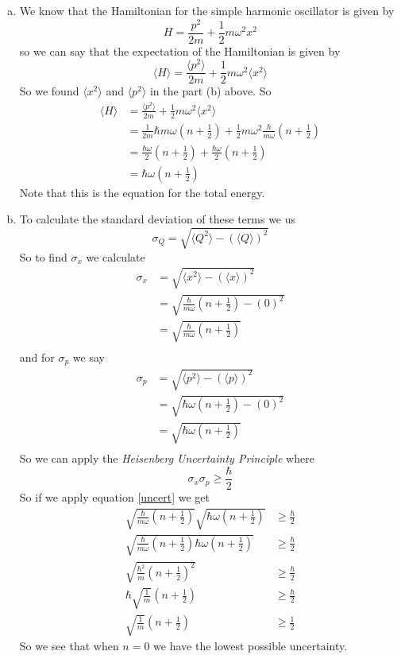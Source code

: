 \documentclass[11pt]{article}
\numberwithin{equation}{section}
\newcommand{\expt}[1]{\langle{#1}\rangle}
\begin{document}
\begin{enumerate}[(a)]
\item
We know that the Hamiltonian for the simple harmonic oscillator is given by
$$H = \frac{p^2}{2m}+\frac{1}{2}m\omega^2x^2$$
so we can say that the expectation of the Hamiltonian is given by
$$\expt{H} = \frac{\expt{p^2}}{2m}+\frac{1}{2}m\omega^2\expt{x^2}$$
So we found $\expt{x^2}$ and $\expt{p^2}$ in the part (b) above. So
\begin{align*}
\expt{H} &= \frac{\expt{p^2}}{2m}+\frac{1}{2}m\omega^2\expt{x^2}\\
&= \frac{1}{2m}\hbar m\omega\left(n+\frac{1}{2}\right)+\frac{1}{2}m\omega^2\frac{\hbar}{m\omega}\left(n+\frac{1}{2}\right)\\
&= \frac{\hbar\omega}{2}\left(n+\frac{1}{2}\right)+\frac{\hbar\omega}{2}\left(n+\frac{1}{2}\right)\\
&= \hbar\omega\left(n+\frac{1}{2}\right)
\end{align*}
Note that this is the equation for the total energy.

\item
To calculate the standard deviation of these terms we us
\begin{equation}
\sigma_Q = \sqrt{\expt{Q^2}-(\expt{Q})^2}
\label{STD}
\end{equation}
So to find $\sigma_x$ we calculate
\begin{align*}
\sigma_x &=\sqrt{\expt{x^2}-(\expt{x})^2}\\ 
&=\sqrt{\frac{\hbar}{m\omega}\left(n+\frac{1}{2}\right)-(0)^2}\\ 
&=\sqrt{\frac{\hbar}{m\omega}\left(n+\frac{1}{2}\right)}\\ 
\end{align*}
and for $\sigma_p$ we say
\begin{align*}
\sigma_p &=\sqrt{\expt{p^2}-(\expt{p})^2}\\ 
&=\sqrt{\hbar\omega\left(n+\frac{1}{2}\right)-(0)^2}\\ 
&=\sqrt{\hbar\omega\left(n+\frac{1}{2}\right)}\\ 
\end{align*}
So we can apply the \emph{Heisenberg Uncertainty Principle} where
\begin{equation}
\sigma_x\sigma_p \ge\frac{\hbar}{2}
\label{uncert}
\end{equation}
So if we apply equation \ref{uncert} we get
\begin{align*}
\sqrt{\frac{\hbar}{m\omega}\left(n+\frac{1}{2}\right)}\sqrt{\hbar\omega\left(n+\frac{1}{2}\right)} &\ge\frac{\hbar}{2}\\ 
\sqrt{\frac{\hbar}{m\omega}\left(n+\frac{1}{2}\right)\hbar\omega\left(n+\frac{1}{2}\right)} &\ge\frac{\hbar}{2}\\ 
\sqrt{\frac{\hbar^2}{m}\left(n+\frac{1}{2}\right)^2} &\ge\frac{\hbar}{2}\\ 
\hbar\sqrt{\frac{1}{m}}\left(n+\frac{1}{2}\right) &\ge\frac{\hbar}{2}\\ 
\sqrt{\frac{1}{m}}\left(n+\frac{1}{2}\right) &\ge\frac{1}{2}
\end{align*}
So we see that when $n=0$ we have the lowest possible uncertainty.
\end{enumerate}
\end{document}
